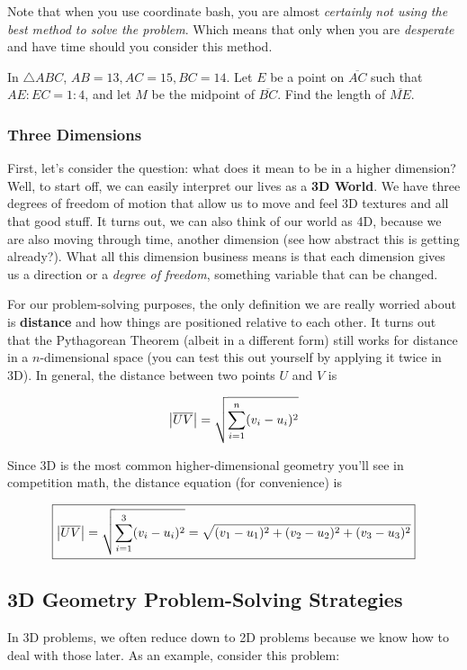 Note that when you use coordinate bash, you are almost \textit{certainly not using the best method to solve the problem}. Which means that only when you are \textit{desperate} and have time should you consider this method.

\begin{problem}
In $\triangle ABC$, $AB=13,AC=15,BC=14$. Let $E$ be a point on $\overline{AC}$ such that $AE:EC=1:4$, and let $M$ be the midpoint of $\overline{BC}$. Find the length of $\overline{ME}$.
\end{problem}

\subsubsection{Three Dimensions}
First, let's consider the question: what does it mean to be in a higher dimension? Well, to start off, we can easily interpret our lives as a \textbf{3D World}. We have three degrees of freedom of motion that allow us to move and feel 3D textures and all that good stuff. It turns out, we can also think of our world as 4D, because we are also moving through time, another dimension (see how abstract this is getting already?). What all this dimension business means is that each dimension gives us a direction or a \textit{degree of freedom}, something variable that can be changed. 

For our problem-solving purposes, the only definition we are really worried about is \textbf{distance} and how things are positioned relative to each other. It turns out that the Pythagorean Theorem (albeit in a different form) still works for distance in a $n$-dimensional space (you can test this out yourself by applying it twice in 3D). In general, the distance between two points $U$ and $V$ is 

\begin{equation}
    \abs{\overline{UV}} = \sqrt{\sum\limits_{i=1}^{n} (v_i-u_i)^2}
\end{equation}

Since 3D is the most common higher-dimensional geometry you'll see in competition math, the distance equation (for convenience) is

\begin{equation}
    \boxed{\abs{\overline{UV}} = \sqrt{\sum\limits_{i=1}^{3} (v_i-u_i)^2}= \sqrt{(v_1-u_1)^2+(v_2-u_2)^2+(v_3-u_3)^2}}
\end{equation}

\subsection{3D Geometry Problem-Solving Strategies}
In 3D problems, we often reduce down to 2D problems because we know how to deal with those later. As an example, consider this problem:

